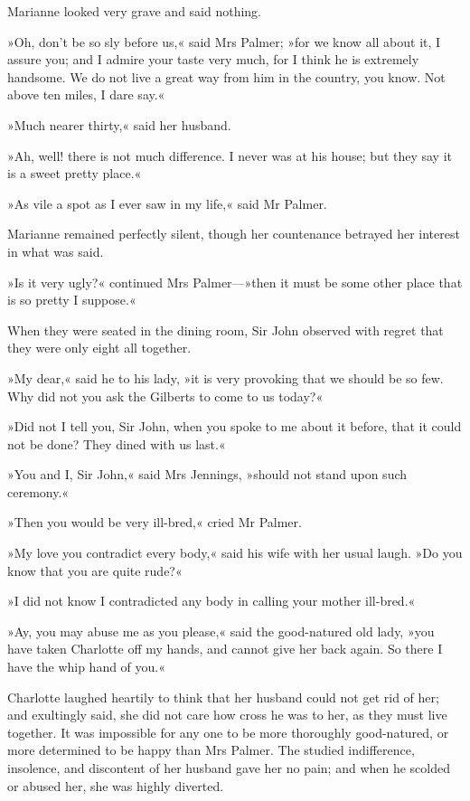 Marianne looked very grave and said nothing.

»Oh, don’t be so sly before us,« said Mrs Palmer; »for we know all about it, I assure you; and I admire your taste very much, for I think he is extremely handsome. We do not live a great way from him in the country, you know. Not above ten miles, I dare say.«

»Much nearer thirty,« said her husband.

»Ah, well! there is not much difference. I never was at his house; but they say it is a sweet pretty place.«

»As vile a spot as I ever saw in my life,« said Mr Palmer.

Marianne remained perfectly silent, though her countenance betrayed her interest in what was said.

»Is it very ugly?« continued Mrs Palmer—»then it must be some other place that is so pretty I suppose.«

When they were seated in the dining room, Sir John observed with regret that they were only eight all together.

»My dear,« said he to his lady, »it is very provoking that we should be so few. Why did not you ask the Gilberts to come to us today?«

»Did not I tell you, Sir John, when you spoke to me about it before, that it could not be done? They dined with us last.«

»You and I, Sir John,« said Mrs Jennings, »should not stand upon such ceremony.«

»Then you would be very ill-bred,« cried Mr Palmer.

»My love you contradict every body,« said his wife with her usual laugh. »Do you know that you are quite rude?«

»I did not know I contradicted any body in calling your mother ill-bred.«

»Ay, you may abuse me as you please,« said the good-natured old lady, »you have taken Charlotte off my hands, and cannot give her back again. So there I have the whip hand of you.«

Charlotte laughed heartily to think that her husband could not get rid of her; and exultingly said, she did not care how cross he was to her, as they must live together. It was impossible for any one to be more thoroughly good-natured, or more determined to be happy than Mrs Palmer. The studied indifference, insolence, and discontent of her husband gave her no pain; and when he scolded or abused her, she was highly diverted.

